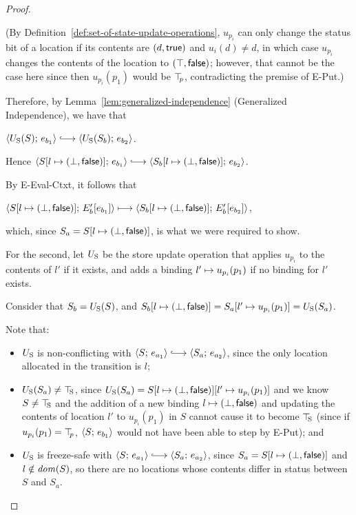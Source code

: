 \begin{proof}
\begin{enumerate}
\begin{enumerate}
\begin{itemize}
        (By Definition~\ref{def:set-of-state-update-operations},
        $u_{p_i}$ can only change the status bit of a location if its
        contents are $(d, \textsf{true})$ and $u_i(d) \neq d$, in
        which case $u_{p_i}$ changes the contents of the location to
        $(\top, \textsf{false})$; however, that cannot be the case
        here since then $u_{p_i}(p_1)$ would be $\top\hspace{-0.85mm}_{p}$, contradicting
        the premise of {\sc E-Put}.)
      \end{itemize}

      Therefore, by Lemma~\ref{lem:generalized-independence}
      (Generalized Independence), we have that

      $\config{\Ustore(S)}{e_{b_1}} \parstepsto
      \config{\Ustore(S_b)}{e_{b_2}}$.

      Hence $\config{\extS{S}{l}{\bot}{\frozenfalse}}{e_{b_1}}
      \parstepsto
      \config{\extS{S_b}{l}{\bot}{\frozenfalse}}{e_{b_2}}$.

      By {\sc E-Eval-Ctxt}, it follows that

      $\langle S[l \mapsto (\bot, \textsf{false})];\, E'_b\hspace{-0.5mm}\left[e_{b_1}\right] \rangle
      \longmapsto
      \langle S_b[l \mapsto (\bot, \textsf{false})];\, E'_b\hspace{-0.5mm}\left[e_{b_2}\right] \rangle$,
      
      which, since $S_a = S[l \mapsto (\bot, \textsf{false})]$, is what we
      were required to show.

      For the second, let $U_{\mathrm{S}}$ be the store update operation that
      applies $u_{p_i}$ to the contents of $l'$ if it exists, and adds
      a binding $l' \mapsto u_{p_i}(p_1)$ if no binding for
      $l'$ exists.

      Consider that $S_b = U_{\mathrm{S}}(S)$, and
      $S_b[l \mapsto (\bot, \textsf{false})] =
      S_a[l' \mapsto u_{p_i}(p_1)] = U_{\mathrm{S}}(S_a)$.

      Note that:
      \begin{itemize}
      \item $U_{\mathrm{S}}$ is non-conflicting with $\config{S}{e_{a_1}}
        \parstepsto \config{S_a}{e_{a_2}}$, since the only location
        allocated in the transition is $l$;
      \item $U_{\mathrm{S}}(S_a) \neq \top\hspace{-0.85mm}_{\mathrm{S}}$, since $U_{\mathrm{S}}(S_a) =
        S[l \mapsto (\bot, \textsf{false})][l' \mapsto u_{p_i}(p_1)]$
        and we know $S \neq \top\hspace{-0.85mm}_{\mathrm{S}}$ and the addition of a new binding
        $l \mapsto (\bot, \textsf{false})$ and updating the
        contents of location $l'$ to $u_{p_i}(p_1)$ in $S$ cannot
        cause it to become $\top\hspace{-0.85mm}_{\mathrm{S}}$ (since if $u_{p_i}(p_1) = \top\hspace{-0.85mm}_{p}$,
        $\langle S;\, e_{b_1} \rangle$ would not have been able to step by {\sc
          E-Put}); and
      \item $U_{\mathrm{S}}$ is freeze-safe with $\config{S}{e_{a_1}} \parstepsto
        \config{S_a}{e_{a_2}}$, since $S_a =
        S[l \mapsto (\bot, \textsf{false})]$ and $l \notin \mathit{dom}(S)$, so
        there are no locations whose contents differ in status between
        $S$ and $S_a$.
      \end{itemize}


\end{enumerate}
\end{enumerate}
\end{proof}
